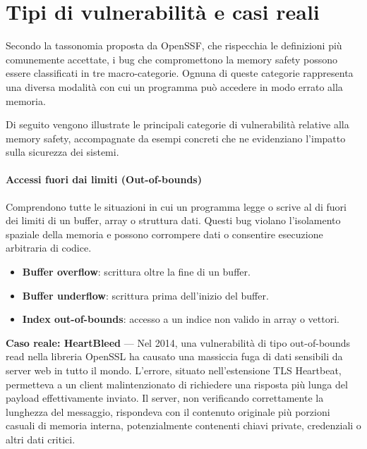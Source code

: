 \section{Tipi di vulnerabilità e casi reali}
\label{sec:vulnerability_types}

Secondo la tassonomia proposta da OpenSSF\cite{memory_safety_continuum_definition},
che rispecchia le definizioni più comunemente accettate, i bug che compromettono
la memory safety possono essere classificati in tre macro-categorie. Ognuna di queste
categorie rappresenta una diversa modalità con cui un programma può accedere in modo
errato alla memoria.

Di seguito vengono illustrate le principali categorie di vulnerabilità relative alla
memory safety, accompagnate da esempi concreti che ne evidenziano l'impatto
sulla sicurezza dei sistemi.

\paragraph{Accessi fuori dai limiti (Out-of-bounds)}
\label{sec:oob}

Comprendono tutte le situazioni in cui un programma legge o scrive al di fuori
dei limiti di un buffer, array o struttura dati. Questi bug violano l'isolamento
spaziale della memoria e possono corrompere dati o consentire esecuzione
arbitraria di codice.

\begin{itemize}
  \item \textbf{Buffer overflow}: scrittura oltre la fine di un buffer.

  \item \textbf{Buffer underflow}: scrittura prima dell'inizio del buffer.

  \item \textbf{Index out-of-bounds}: accesso a un indice non valido in array o vettori.
\end{itemize}

\textbf{Caso reale: HeartBleed} — Nel 2014, una vulnerabilità di tipo out-of-bounds
read nella libreria OpenSSL ha causato una massiccia fuga di dati sensibili da server
web in tutto il mondo. L'errore, situato nell'estensione TLS Heartbeat,
permetteva a un client malintenzionato di richiedere una risposta più lunga del
payload effettivamente inviato. Il server, non verificando correttamente la
lunghezza del messaggio, rispondeva con il contenuto originale più porzioni casuali
di memoria interna, potenzialmente contenenti chiavi private, credenziali o altri
dati critici\cite{heartbleed}.

